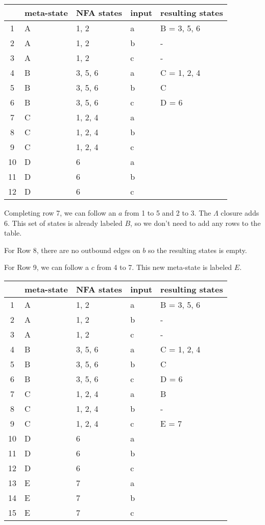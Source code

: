 \documentclass[letterpaper,12pt,openany,reqno]{book}%
\begin{document}
\begin{center}
\small
\begin{tabular}{c|l|l|l|l}
\hline
& \textbf{meta-state} & \textbf{NFA states} & \textbf{input} & \textbf{resulting states} \\
\hline
1 & A & 1, 2 & a & B = 3, 5, 6 \\
2 & A & 1, 2 & b & - \\
3 & A & 1, 2 & c & - \\
4 & B & 3, 5, 6 & a & C = 1, 2, 4 \\
5 & B & 3, 5, 6 & b & C \\
6 & B & 3, 5, 6 & c & D = 6 \\
7 & C & 1, 2, 4 & a & \\
8 & C & 1, 2, 4 & b & \\
9 & C & 1, 2, 4 & c & \\
10 & D & 6 & a & \\
11 & D & 6 & b & \\
12 & D & 6 & c & \\
\hline
\end{tabular}
\end{center}

Completing row 7, we can follow an $a$ from 1 to 5 and 2 to 3. The $\Lambda$ closure adds 6. This set of states is already labeled $B$, so we don't need to add any rows to the table.

For Row 8, there are no outbound edges on $b$ so the resulting states is empty.

For Row 9, we can follow a $c$ from 4 to 7. This new meta-state is labeled $E$.

\begin{center}
\small
\begin{tabular}{c|l|l|l|l}
\hline
& \textbf{meta-state} & \textbf{NFA states} & \textbf{input} & \textbf{resulting states} \\
\hline
1 & A & 1, 2 & a & B = 3, 5, 6 \\
2 & A & 1, 2 & b & - \\
3 & A & 1, 2 & c & - \\
4 & B & 3, 5, 6 & a & C = 1, 2, 4 \\
5 & B & 3, 5, 6 & b & C \\
6 & B & 3, 5, 6 & c & D = 6 \\
7 & C & 1, 2, 4 & a & B\\
8 & C & 1, 2, 4 & b & -\\
9 & C & 1, 2, 4 & c & E = 7 \\
10 & D & 6 & a & \\
11 & D & 6 & b & \\
12 & D & 6 & c & \\
13 & E & 7 & a & \\
14 & E & 7 & b & \\
15 & E & 7 & c & \\
\hline
\end{tabular}
\end{center}
\end{document}
